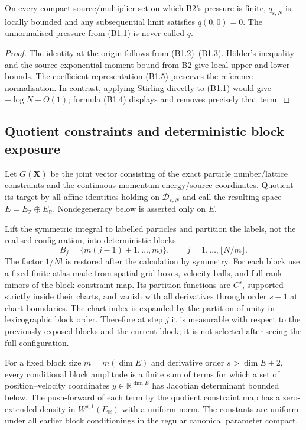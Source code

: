 \begin{proposition}
\label{prop:r23-b1-normalization}
On every compact source/multiplier set on which B2's pressure is finite,
$q_{\varepsilon,N}$ is locally bounded and any subsequential limit satisfies
$q(0,0)=0$.  The unnormalised pressure from (B1.1) is never called $q$.
\end{proposition}

\begin{proof}
The identity at the origin follows from (B1.2)--(B1.3).  Hölder's inequality
and the source exponential moment bound from B2 give local upper and lower
bounds.  The coefficient representation (B1.5) preserves the reference
normalisation.  In contrast, applying Stirling directly to (B1.1) would give
$-\log N+O(1)$; formula (B1.4) displays and removes precisely that term.
\end{proof}

\subsection{Quotient constraints and deterministic block exposure}

Let $G(\mathbf X)$ be the joint vector consisting of the exact particle
number/lattice constraints and the continuous momentum-energy/source
coordinates.  Quotient its target by all affine identities holding on
$\mathcal D_{\varepsilon,N}$ and call the resulting space $E=E_{\mathbb Z}
\oplus E_{\mathbb R}$.  Nondegeneracy below is asserted only on $E$.

Lift the symmetric integral to labelled particles and partition the labels,
not the realised configuration, into deterministic blocks
\[
 B_j=\{m(j-1)+1,\ldots,mj\},\qquad j=1,\ldots,\lfloor N/m\rfloor.         \tag{B1.6}
\]
The factor $1/N!$ is restored after the calculation by symmetry.  For each
block use a fixed finite atlas made from spatial grid boxes, velocity balls,
and full-rank minors of the block constraint map.  Its partition functions
are $C^s$, supported strictly inside their charts, and vanish with all
derivatives through order $s-1$ at chart boundaries.  The chart index is
expanded by the partition of unity in lexicographic block order.  Therefore
at step $j$ it is measurable with respect to the previously exposed blocks
and the current block; it is not selected after seeing the full
configuration.

\begin{lemma}
\label{lem:r23-b1-block}
For a fixed block size $m=m(\dim E)$ and derivative order
$s>\dim E+2$, every conditional block amplitude is a finite sum of terms for
which a set of position--velocity coordinates $y\in\mathbb R^{\dim E}$ has
Jacobian determinant bounded below.  The push-forward of each term by the
quotient constraint map has a zero-extended density in $W^{s,1}(E_{\mathbb R})$
with a uniform norm.  The constants are uniform under all earlier block
conditionings in the regular canonical parameter compact.
\end{lemma}

